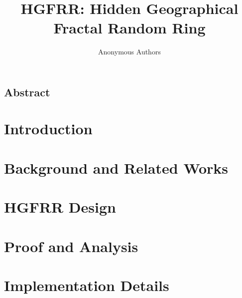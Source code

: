 \documentclass[letterpaper,twocolumn,10pt]{article}
\begin{document}
\date{}

\title{\Large \bf HGFRR: Hidden Geographical Fractal Random Ring}


\author{
{\rm Anonymous Authors}\\
}

\maketitle

\thispagestyle{empty}

\subsection*{Abstract}


\section{Introduction}


\section{Background and Related Works}


\section{HGFRR Design}


\section{Proof and Analysis}


\section{Implementation Details}

\end{document}
